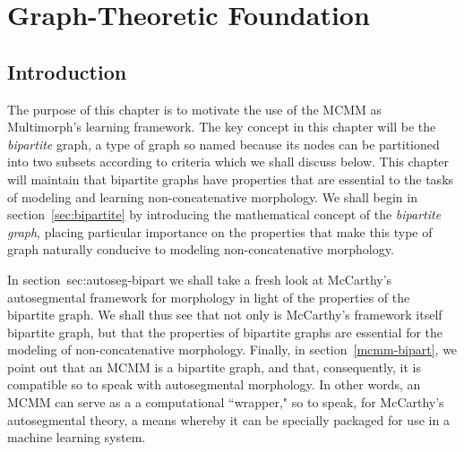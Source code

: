 \chapter{Graph-Theoretic Foundation}
\label{ch:graph}
\section{Introduction}
The purpose of this chapter is to motivate the use of the \ac{MCMM} as Multimorph's learning framework. The key concept in this chapter will be the \emph{bipartite} graph, a type of graph so named because its nodes can be partitioned into two subsets according to criteria which we shall discuss below. This chapter will maintain that bipartite graphs have properties that are essential to the tasks of modeling and learning non-concatenative morphology.
We shall begin in section~\ref{sec:bipartite} by introducing the mathematical concept of the \emph{bipartite graph}, placing particular importance on the properties that make this type of graph naturally conducive to modeling non-concatenative morphology. %

In section~{sec:autoseg-bipart} we shall take a fresh look at McCarthy's autosegmental framework for morphology \citep{mccarthy:1981} in light of the properties of the bipartite graph. We shall thus see that not only is McCarthy's framework itself bipartite graph, but that the properties of bipartite graphs are essential for the modeling of non-concatenative morphology.
Finally, in section~\ref{mcmm-bipart}, we point out that an \ac{MCMM} is a bipartite graph, and that, consequently, it is compatible so to  speak with autosegmental morphology. In other words, an MCMM can serve as a
a computational ``wrapper," so to speak, for McCarthy's autosegmental theory, a means whereby it can be specially packaged for use in a machine learning system. 
 
